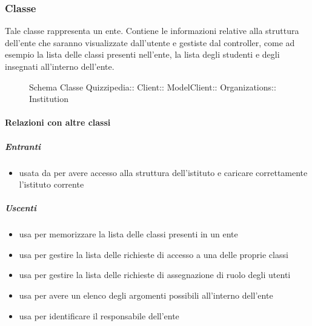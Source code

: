 \subsubsection{Classe }
Tale classe rappresenta un ente. Contiene le informazioni relative alla struttura dell'ente che saranno visualizzate dall'utente e gestiste dal controller, come ad esempio la lista delle classi presenti nell'ente, la lista degli studenti e degli insegnati all'interno dell'ente.
\begin{figure}[H]
\centering
\noindent{}
\caption[Schema Classe Institution]{Schema Classe Quizzipedia:: Client:: ModelClient:: Organizations:: Institution}
\end{figure}
\paragraph{Relazioni con altre classi}
\subparagraph{Entranti}
\begin{itemize}
\item usata da  per avere accesso alla struttura dell'istituto e caricare correttamente l'istituto corrente
\end{itemize}
\subparagraph{Uscenti}
\begin{itemize}
\item usa  per memorizzare la lista
delle classi presenti in un ente
\item usa  per gestire la lista delle richieste di accesso a una delle proprie classi
\item usa  per gestire la lista delle richieste di assegnazione di ruolo degli utenti
\item usa  per avere un elenco degli argomenti possibili all'interno dell'ente
\item usa  per identificare il responsabile dell'ente
\end{itemize}
